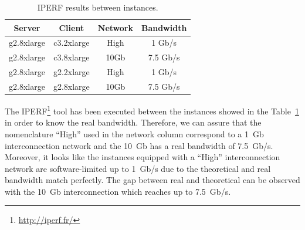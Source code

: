 \documentclass[a4paper,twoside]{article}
\begin{document}
\begin{table}[htb]
\renewcommand{\arraystretch}{1.3}
\caption{IPERF results between instances.}
\label{table:iperf}
\tabcolsep=0.24cm
\begin{center}\begin{tabular}{cccc}
Server & Client & Network & Bandwidth\\ \hline \hline
g2.8xlarge & c3.2xlarge & High & 1  Gb/s\\ \hline
g2.8xlarge & c3.8xlarge & 10Gb & 7.5  Gb/s\\ \hline
g2.8xlarge & g2.2xlarge & High & 1 Gb/s\\ \hline
g2.8xlarge & g2.8xlarge & 10Gb & 7.5  Gb/s\\ \hline
\end{tabular}\end{center}\end{table}

The IPERF\footnote{\url{http://iperf.fr/}} tool has been executed between the instances showed in 
the Table~\ref{table:iperf} in order to know the real bandwidth.
Therefore, we can assure that the nomenclature ``High'' used in the 
network column correspond to a 1~Gb interconnection network and the 10~Gb has 
a real bandwidth of 7.5~Gb/s.
Moreover, it looks like the instances equipped with a ``High'' interconnection network
are software-limited up to 1~Gb/s due to the theoretical and real bandwidth 
match perfectly. The gap between real and theoretical can be observed with 
the 10~Gb interconnection which reaches up to 7.5~Gb/s.
\end{document}
